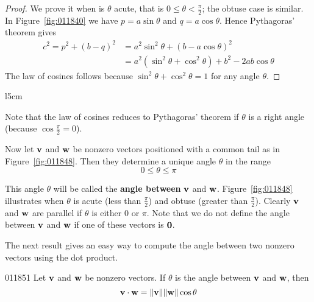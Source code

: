 \begin{proof} We prove it when is $\theta$ acute, that is $0 \leq \theta < \frac{\pi}{2}$; the obtuse case is similar. In Figure~\ref{fig:011840} we have $p = a \sin \theta$ and $q = a \cos \theta$. Hence Pythagoras' theorem gives
\begin{align*}
c^2 = p^2 + (b - q)^2 &= a^2\sin^2\theta + (b - a\cos\theta)^2 \\
					  &= a^2(\sin^2\theta + \cos^2\theta) +b^2 - 2ab\cos\theta
\end{align*}
The law of cosines follows because $\sin^{2} \theta + \cos^{2} \theta = 1$ for any angle $\theta$.
\end{proof}

\newpage
\begin{wrapfigure}[13]{l}{5cm} 
\centering

\caption{\label{fig:011848}}
\end{wrapfigure}

\noindent Note that the law of cosines reduces to Pythagoras' theorem if $\theta$ is a right angle (because $\cos\frac{\pi}{2} = 0$).

Now let $\textbf{v}$ and $\textbf{w}$ be nonzero vectors positioned with a common tail as in Figure~\ref{fig:011848}. Then they determine a unique angle $\theta$ in the range
\begin{equation*}
0 \leq \theta \leq \pi
\end{equation*}

This angle $\theta$ will be called the \textbf{angle between} $\textbf{v}$ and $\textbf{w}$. Figure~\ref{fig:011848} illustrates when $\theta$ is acute (less than $\frac{\pi}{2}$) and obtuse (greater than $\frac{\pi}{2}$). Clearly $\textbf{v}$ and $\textbf{w}$ are parallel if $\theta$ is either $0$ or $\pi$. Note that we do not define the angle between $\textbf{v}$ and $\textbf{w}$ if one of these vectors is $\textbf{0}$.


The next result gives an easy way to compute the angle between two nonzero vectors using the dot product.


\begin{theorem}{}{011851}
Let $\textbf{v}$ and $\textbf{w}$ be nonzero vectors. If $\theta$ is the angle between $\textbf{v}$ and $\textbf{w}$, then
\begin{equation*}
\textbf{v} \cdot \textbf{w} = \| \textbf{v} \| \| \textbf{w} \| \cos\theta
\end{equation*}
\end{theorem}

